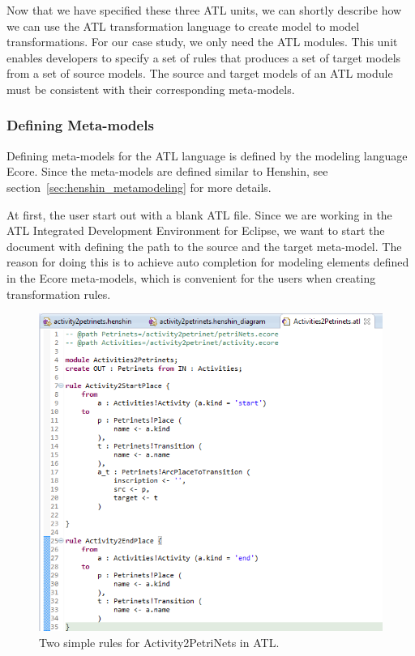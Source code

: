 Now that we have specified these three ATL units, we can shortly describe how
we can use the ATL transformation language to create model to model
transformations. For our case study, we only need the ATL modules. This unit
enables developers to specify a set of rules that produces a set of target
models from a set of source models. The source and target models of an ATL
module must be consistent with their corresponding meta-models. 

\subsubsection*{Defining Meta-models}

Defining meta-models for the ATL language is defined by the modeling language
Ecore. Since the meta-models are defined similar to Henshin, see
section~\ref{sec:henshin_metamodeling} for more details. 

At first, the user start out with a blank ATL file. Since we are working in
the ATL Integrated Development Environment for Eclipse, we want to start the
document with defining the path to the source and the target meta-model. The
reason for doing this is to achieve auto completion for modeling elements
defined in the Ecore meta-models, which is convenient for the users when
creating transformation rules.  

\begin{figure}[H]
	\centering
	\includegraphics[scale=0.5]{figures/ATLScreen.png}
	\caption[Simple rules for ATL]
	{Two simple rules for Activity2PetriNets in ATL.}
	\label{fig:ATL_Screen}
\end{figure}

